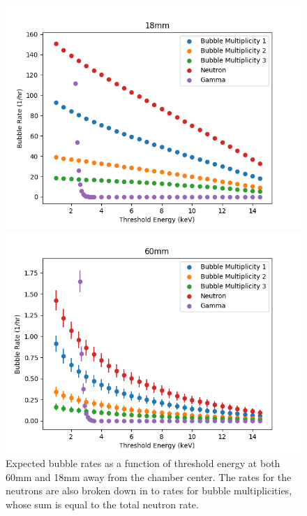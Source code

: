 \documentclass[%
12pt,
twoside,
reprint,
amsmath,amssymb,
aps,
]{article}
\begin{document}
	\begin{figure}[t]
		\begin{minipage}{0.5\textwidth}
			\centering
			\includegraphics[width=1.1\linewidth]{Images/18mm_final_no_caps.png}
		\end{minipage}
		\begin{minipage}{0.5\textwidth}
			\centering
			\includegraphics[width=1.1\linewidth]{Images/60mm_final_no_caps.png}
		\end{minipage}
		\caption{\label{tab:table-name} Expected bubble rates as a function of threshold energy at both 60mm and 18mm away from the chamber center. The rates for the neutrons are also broken down in to rates for bubble multiplicities, whose sum is equal to the total neutron rate.}
	\end{figure}
	
\end{document}
